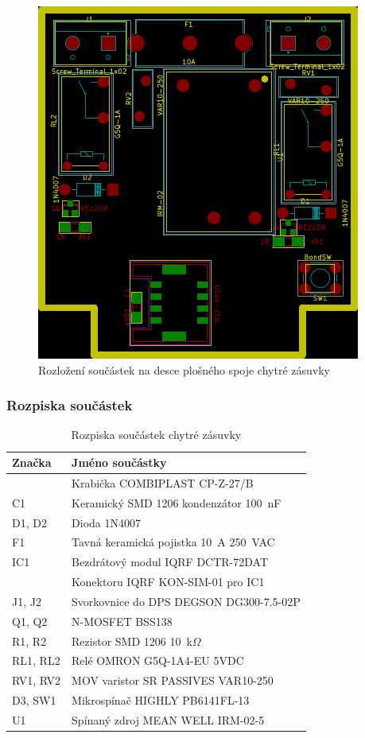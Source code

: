 \documentclass[12pt,a4paper,oneside]{article}
\begin{document}
\begin{figure}[H]
\centering
\label{fig:components}
\includegraphics{img/kicad/components.pdf}
\caption{Rozložení součástek na desce plošného spoje chytré zásuvky}
\end{figure}

\newpage

\subsubsection{Rozpiska součástek}

\begin{table}[H]
	\centering
	\begin{tabular}{|l|l|}
		\hline
		\textbf{Značka} & \textbf{Jméno součástky} \\
		\hline
		\hline
		~ & Krabička COMBIPLAST CP-Z-27/B \\
		\hline
		C1 & Keramický SMD 1206 kondenzátor 100~nF \\
		\hline
		D1, D2 & Dioda 1N4007 \\
		\hline
		F1 & Tavná keramická pojistka 10~A 250~VAC \\
		\hline
		IC1 & Bezdrátový modul IQRF DCTR-72DAT \\
		\hline
		~ & Konektoru IQRF KON-SIM-01 pro IC1 \\
		\hline
		J1, J2 & Svorkovnice do DPS\index[zkr]{DPS!Deska plošných spojů|textit} DEGSON DG300-7.5-02P \\
		\hline
		Q1, Q2 & N-MOSFET BSS138 \\
		\hline
		R1, R2 & Rezistor SMD 1206 10~k$\Omega$ \\
		\hline
		RL1, RL2 & Relé OMRON G5Q-1A4-EU 5VDC \\
		\hline
		RV1, RV2 & MOV varistor SR PASSIVES VAR10-250 \\
		\hline
		D3, SW1 & Mikrospínač HIGHLY PB6141FL-13 \\
		\hline
		U1 & Spínaný zdroj MEAN WELL IRM-02-5 \\
		\hline
	\end{tabular}
	\caption{Rozpiska součástek chytré zásuvky}\label{table:rozpiska-soucastek}
\end{table}
\end{document}
